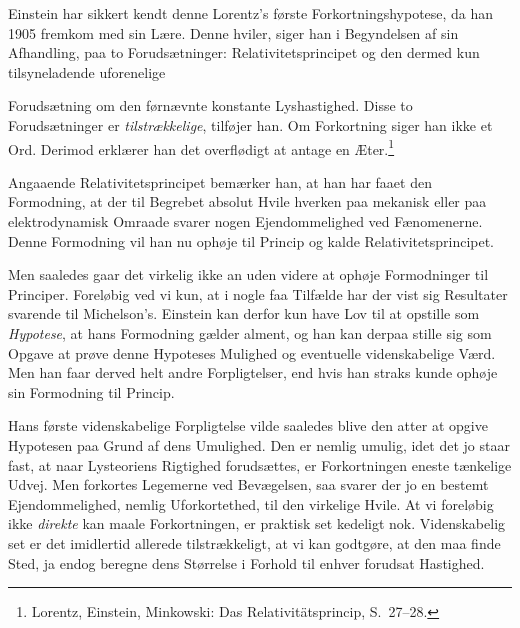 \documentclass[12pt,a4paper]{article}
\newcommand{\opage}[1]{\marginnote{\footnotesize\textit{[#1]}}}
\begin{document}
Einstein har sikkert kendt denne Lorentz's første Forkortningshypotese, da han
1905 fremkom med sin Lære. Denne hviler, siger han i Begyndelsen af sin
Afhandling, paa to Forudsætninger: Relativitetsprincipet og den dermed
\guillemotright kun tilsyneladende uforenelige\guillemotleft{}

\opage{198} Forudsætning om den førnævnte konstante Lyshastighed. Disse to Forudsætninger
er \emph{tilstrækkelige}, tilføjer han. Om Forkortning siger han ikke et Ord.
Derimod erklærer han det overflødigt at antage en
Æter.\footnote{Lorentz, Einstein, Minkowski: Das Relativitätsprincip,
S.\ 27--28.}

Angaaende \guillemotright Relativitetsprincipet\guillemotleft{} bemærker han,
at han har faaet den Formodning, at der til Begrebet absolut Hvile hverken paa
mekanisk eller paa elektrodynamisk Omraade svarer nogen Ejendommelighed ved
Fænomenerne. Denne Formodning vil han nu \guillemotright ophøje til
Princip\guillemotleft{} og kalde Relativitetsprincipet.

Men saaledes gaar det virkelig ikke an uden videre at ophøje Formodninger til
\guillemotright Principer\guillemotleft. Foreløbig ved vi kun, at i nogle faa
Tilfælde har der vist sig Resultater svarende til Michelson's. Einstein kan
derfor kun have Lov til at opstille som \emph{Hypotese}, at hans Formodning
gælder alment, og han kan derpaa stille sig som Opgave at prøve denne Hypoteses
Mulighed og eventuelle videnskabelige Værd. Men han faar derved helt andre
Forpligtelser, end hvis han straks kunde ophøje sin Formodning til Princip.

Hans første videnskabelige Forpligtelse vilde saaledes blive den atter at
opgive Hypotesen paa Grund af dens Umulighed. Den er nemlig umulig, idet det jo
staar fast, at naar Lysteoriens Rigtighed forudsættes, er Forkortningen eneste
tænkelige Udvej. Men forkortes Legemerne ved Bevægelsen, saa svarer der jo en
bestemt Ejendommelighed, nemlig Uforkortethed, til den virkelige Hvile. At vi
foreløbig ikke \emph{direkte} kan maale Forkortningen, er praktisk set
kedeligt nok. Videnskabelig set er det imidlertid allerede tilstrækkeligt, at
vi kan godtgøre, at den maa finde Sted, ja endog beregne dens Størrelse i
Forhold til enhver forudsat Hastighed.
\end{document}

